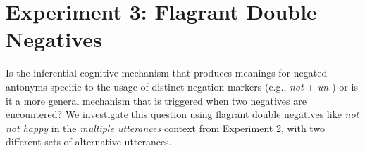 \documentclass[floatsintext,doc]{apa6}
\let\rmarkdownfootnote\footnote%
\def\footnote{\protect\rmarkdownfootnote}
\begin{document}
\section{Experiment 3: Flagrant Double Negatives}\label{experiment-3-notnot}


Is the inferential cognitive mechanism that produces meanings for negated antonyms specific to the usage of distinct negation markers (e.g., \emph{not} + \emph{un-}) or is it a more general mechanism that is triggered when two negatives are encountered?
We investigate this question using flagrant double negatives like \emph{not not happy} in the \emph{multiple utterances} context from Experiment 2, with two different sets of alternative utterances. 
\end{document}
